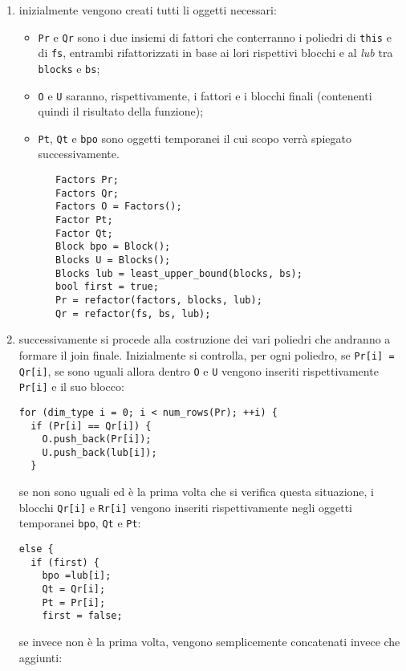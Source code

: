 \documentclass{mimosis}
\theoremstyle{definition}
\begin{document}
\begin{enumerate}
\item inizialmente vengono creati tutti li oggetti necessari:
\begin{itemize}
\item \texttt{Pr} e \texttt{Qr} sono i due insiemi di fattori che conterranno i
poliedri di \texttt{this} e di \texttt{fs}, entrambi rifattorizzati in base ai lori
rispettivi blocchi e al \emph{lub} tra \texttt{blocks} e \texttt{bs};
\item \texttt{O} e \texttt{U} saranno, rispettivamente, i fattori e i blocchi finali
(contenenti quindi il risultato della funzione);
\item \texttt{Pt}, \texttt{Qt} e \texttt{bpo} sono oggetti temporanei il cui scopo verrà spiegato
successivamente.
\lstset{style=mystyle,language=C++,label= ,caption= ,captionpos=b,numbers=none}
\begin{lstlisting}
   Factors Pr;
   Factors Qr;
   Factors O = Factors();
   Factor Pt;
   Factor Qt;
   Block bpo = Block();
   Blocks U = Blocks();
   Blocks lub = least_upper_bound(blocks, bs);
   bool first = true;
   Pr = refactor(factors, blocks, lub);
   Qr = refactor(fs, bs, lub);
\end{lstlisting}
\end{itemize}
\item successivamente si procede alla costruzione dei vari poliedri che andranno a
formare il join finale. Inizialmente si controlla, per ogni poliedro, se
\texttt{Pr[i] = Qr[i]}, se sono uguali allora dentro \texttt{O} e \texttt{U} vengono inseriti
rispettivamente \texttt{Pr[i]} e il suo blocco:
\lstset{style=mystyle,language=C++,label= ,caption= ,captionpos=b,numbers=none}
\begin{lstlisting}
for (dim_type i = 0; i < num_rows(Pr); ++i) {
  if (Pr[i] == Qr[i]) {
    O.push_back(Pr[i]);
    U.push_back(lub[i]);
  }
\end{lstlisting}
se non sono uguali ed è la prima volta che si verifica
questa situazione, i blocchi \texttt{Qr[i]} e \texttt{Rr[i]} vengono inseriti
rispettivamente negli oggetti temporanei \texttt{bpo}, \texttt{Qt} e \texttt{Pt}:
\lstset{style=mystyle,language=C++,label= ,caption= ,captionpos=b,numbers=none}
\begin{lstlisting}
else {
  if (first) {
    bpo =lub[i];
    Qt = Qr[i];
    Pt = Pr[i];
    first = false;
\end{lstlisting}
se invece non è la prima volta, vengono semplicemente concatenati invece che
aggiunti:
\lstset{style=mystyle,language=C++,label= ,caption= ,captionpos=b,numbers=none}

\end{enumerate}
\end{document}
